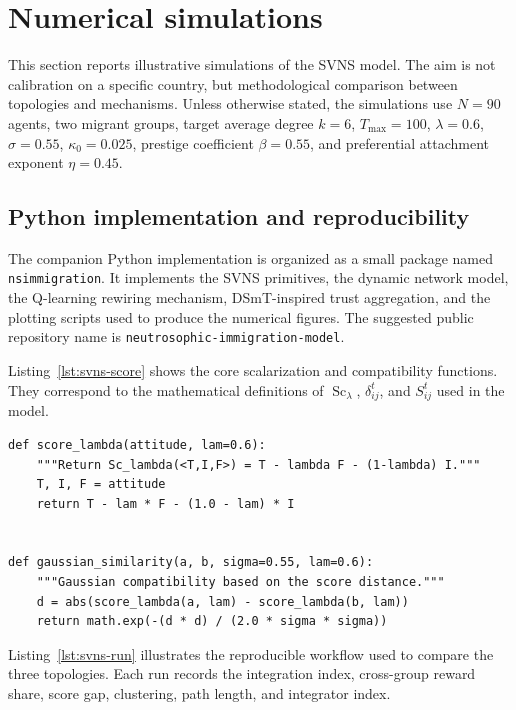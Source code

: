 \documentclass[11pt,a4paper]{article}
\begin{document}
	\section{Numerical simulations}\label{sec:numerical}
	This section reports illustrative simulations of the SVNS model. The aim is not calibration on a specific country, but methodological comparison between topologies and mechanisms. Unless otherwise stated, the simulations use $N=90$ agents, two migrant groups, target average degree $k=6$, $T_{\max}=100$, $\lambda=0.6$, $\sigma=0.55$, $\kappa_0=0.025$, prestige coefficient $\beta=0.55$, and preferential attachment exponent $\eta=0.45$.
	

\subsection{Python implementation and reproducibility}
The companion Python implementation is organized as a small package named \texttt{nsimmigration}. It implements the SVNS primitives, the dynamic network model, the Q-learning rewiring mechanism, DSmT-inspired trust aggregation, and the plotting scripts used to produce the numerical figures. The suggested public repository name is \texttt{neutrosophic-immigration-model}.

Listing~\ref{lst:svns-score} shows the core scalarization and compatibility functions. They correspond to the mathematical definitions of $\operatorname{Sc}_{\lambda}$, $\delta_{ij}^t$, and $S_{ij}^t$ used in the model.

\begin{lstlisting}[style=pyStyle,caption={SVNS score and Gaussian similarity used by the Python implementation.},label={lst:svns-score}]
def score_lambda(attitude, lam=0.6):
    """Return Sc_lambda(<T,I,F>) = T - lambda F - (1-lambda) I."""
    T, I, F = attitude
    return T - lam * F - (1.0 - lam) * I


def gaussian_similarity(a, b, sigma=0.55, lam=0.6):
    """Gaussian compatibility based on the score distance."""
    d = abs(score_lambda(a, lam) - score_lambda(b, lam))
    return math.exp(-(d * d) / (2.0 * sigma * sigma))
\end{lstlisting}

Listing~\ref{lst:svns-run} illustrates the reproducible workflow used to compare the three topologies. Each run records the integration index, cross-group reward share, score gap, clustering, path length, and integrator index.
\end{document}
